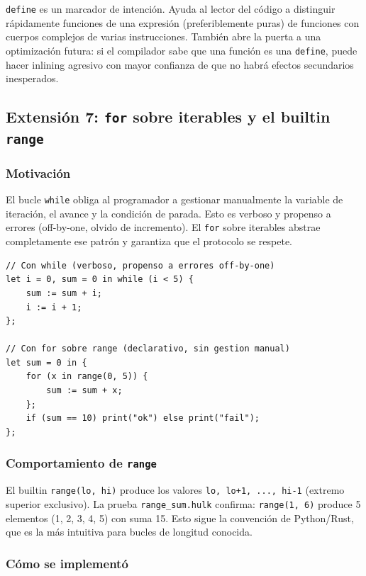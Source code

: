 \documentclass[12pt,letterpaper]{article}
\newcommand{\src}[1]{\texttt{#1}}
\begin{document}
\src{define} es un marcador de intención. Ayuda al lector del código a distinguir rápidamente funciones de una expresión (preferiblemente puras) de funciones con cuerpos complejos de varias instrucciones. También abre la puerta a una optimización futura: si el compilador sabe que una función es una \src{define}, puede hacer inlining agresivo con mayor confianza de que no habrá efectos secundarios inesperados.

\subsection{Extensión 7: \src{for} sobre iterables y el builtin \src{range}}

\subsubsection{Motivación}

El bucle \src{while} obliga al programador a gestionar manualmente la variable de iteración, el avance y la condición de parada. Esto es verboso y propenso a errores (off-by-one, olvido de incremento). El \src{for} sobre iterables abstrae completamente ese patrón y garantiza que el protocolo se respete.

\begin{lstlisting}[language=HULK,caption={for sobre range como alternativa a while manual}]
// Con while (verboso, propenso a errores off-by-one)
let i = 0, sum = 0 in while (i < 5) {
    sum := sum + i;
    i := i + 1;
};

// Con for sobre range (declarativo, sin gestion manual)
let sum = 0 in {
    for (x in range(0, 5)) {
        sum := sum + x;
    };
    if (sum == 10) print("ok") else print("fail");
};
\end{lstlisting}

\subsubsection{Comportamiento de \src{range}}

El builtin \src{range(lo, hi)} produce los valores \src{lo, lo+1, ..., hi-1} (extremo superior exclusivo). La prueba \src{range\_sum.hulk} confirma: \src{range(1, 6)} produce 5 elementos (1, 2, 3, 4, 5) con suma 15. Esto sigue la convención de Python/Rust, que es la más intuitiva para bucles de longitud conocida.

\subsubsection{Cómo se implementó}
\end{document}
